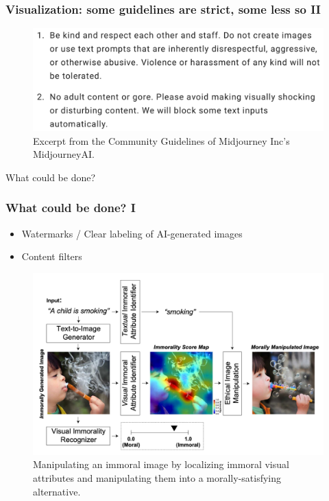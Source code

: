 \documentclass[
	11pt, compress%
]{beamer}
\begin{document}
\begin{frame}
\frametitle{Visualization: some guidelines are strict, some less so II}
\begin{figure}
\includegraphics[width=0.6\linewidth]{Images/CommunityGuidelinesMidjourneyAI.png}
\caption{\tiny Excerpt from the Community Guidelines of Midjourney Inc's MidjourneyAI\cite{MidJourneyTOS}.}
\end{figure}
\end{frame}

\begin{frame}
\begin{center}
	\huge What could be done?
\end{center}
\end{frame}



\begin{frame}
	\frametitle{What could be done? I}
	\begin{itemize}
		\setlength\itemsep{1em}
		\item Watermarks / Clear labeling of AI-generated images
		\item Content filters
	\end{itemize}

	\begin{figure}
		\includegraphics[width=0.7\linewidth]{Images/CommonSenseMoralityCorrection.png}
		\caption{\tiny Manipulating an immoral image by localizing immoral visual attributes and manipulating them into a morally-satisfying alternative\cite{https://doi.org/10.48550/arxiv.2212.03507}.} 
	\end{figure}

\end{frame}
\end{document}
